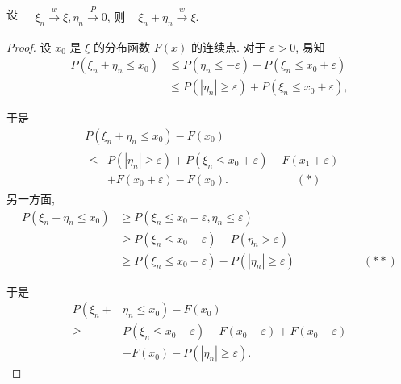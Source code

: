 \begin{theorem}
    设 $\begin{aligned} & \xi_n \stackrel{w}{\longrightarrow} \xi, \eta_n \stackrel{P}{\longrightarrow} 0 \text {, 则 }  & \xi_n+\eta_n \stackrel{w}{\longrightarrow} \xi .\end{aligned}$
\end{theorem}
{\scriptsize{
    \linespread{0.5}
\begin{proof}
    设 $x_0$ 是 $\xi$ 的分布函数 $F(x)$ 的连续点. 对于 $\varepsilon>0$, 易知
$$
\begin{aligned}
P\left(\xi_n+\eta_n \leqslant x_0\right) & \leqslant P\left(\eta_n \leqslant-\varepsilon\right)+P\left(\xi_n \leqslant x_0+\varepsilon\right) \\
& \leqslant P\left(\left|\eta_n\right| \geqslant \varepsilon\right)+P\left(\xi_n \leqslant x_0+\varepsilon\right),
\end{aligned}
$$

于是
$$
\begin{aligned}
&P\left(\xi_n+\eta_n \leqslant x_0\right)-F\left(x_0\right)\\
&\begin{aligned}
\leqslant & P\left(\left|\eta_n\right| \geqslant \varepsilon\right)+P\left(\xi_n \leqslant x_0+\varepsilon\right)-F\left(x_1+\varepsilon\right) \\
& +F\left(x_0+\varepsilon\right)-F\left(x_0\right) . \qquad\qquad\qquad (*)
\end{aligned}
\end{aligned}
$$
另一方面,
$$
\begin{aligned}
P\left(\xi_n+\eta_n \leqslant x_0\right) & \geqslant P\left(\xi_n \leqslant x_0-\varepsilon, \eta_n \leqslant \varepsilon\right) \\
& \geqslant P\left(\xi_n \leqslant x_0-\varepsilon\right)-P\left(\eta_n>\varepsilon\right) \\
& \geqslant P\left(\xi_n \leqslant x_0-\varepsilon\right)-P\left(\left|\eta_n\right| \geqslant \varepsilon\right)\qquad\qquad\qquad (**)
\end{aligned}
$$

于是
$$
\begin{aligned}
P\left(\xi_n+\right. & \left.\eta_n \leqslant x_0\right)-F\left(x_0\right) \\
\geqslant & P\left(\xi_n \leqslant x_0-\varepsilon\right)-F\left(x_0-\varepsilon\right)+F\left(x_0-\varepsilon\right) \\
& -F\left(x_0\right)-P\left(\left|\eta_n\right| \geqslant \varepsilon\right) .
\end{aligned}
$$


\end{proof}}}
